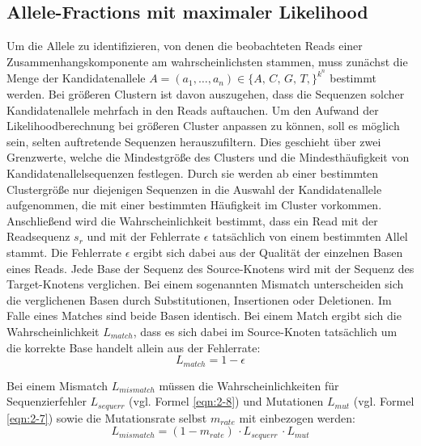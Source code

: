 \subsection{Allele-Fractions mit maximaler Likelihood} \label{subsec:sol_allele_lh}

Um die Allele zu identifizieren, von denen die beobachteten Reads einer Zusammenhangskomponente am wahrscheinlichsten stammen, muss zunächst die Menge der Kandidatenallele $A=(a_{1}, \dots, a_{n}) \in \{A,\,C,\,G,\,T,\}^{k^n}$ bestimmt werden. Bei größeren Clustern ist davon auszugehen, dass die Sequenzen solcher Kandidatenallele mehrfach in den Reads auftauchen. Um den Aufwand der Likelihoodberechnung bei größeren Cluster anpassen zu können, soll es möglich sein, selten auftretende Sequenzen herauszufiltern. Dies geschieht über zwei Grenzwerte, welche die Mindestgröße des Clusters und die Mindesthäufigkeit von Kandidatenallelsequenzen festlegen. Durch sie werden ab einer bestimmten Clustergröße nur diejenigen Sequenzen in die Auswahl der Kandidatenallele aufgenommen, die mit einer bestimmten Häufigkeit im Cluster vorkommen.\\

Anschließend wird die Wahrscheinlichkeit bestimmt, dass ein Read mit der Readsequenz $s_{r}$ und mit der Fehlerrate $\epsilon$ tatsächlich von einem bestimmten Allel stammt. Die Fehlerrate $\epsilon$ ergibt sich dabei aus der Qualität der einzelnen Basen eines Reads. Jede Base der Sequenz des Source-Knotens wird mit der Sequenz des Target-Knotens verglichen. Bei einem sogenannten Mismatch unterscheiden sich die verglichenen Basen durch Substitutionen, Insertionen oder Deletionen. Im Falle eines Matches sind beide Basen identisch. Bei einem Match ergibt sich die Wahrscheinlichkeit $L_{match}$, dass es sich dabei im Source-Knoten tatsächlich um die korrekte Base handelt allein aus der Fehlerrate:
\begin{equation} \label{eqn:2-13}
\tag{2-13}
L_{match} = 1 - \epsilon
\end{equation}

Bei einem Mismatch $L_{mismatch}$ müssen die Wahrscheinlichkeiten für Sequenzierfehler $L_{sequerr}$ (vgl. Formel \eqref{eqn:2-8}) und Mutationen $L_{mut}$ (vgl. Formel \eqref{eqn:2-7}) sowie die Mutationsrate selbst $m_{rate}$ mit einbezogen werden: 
\begin{equation} \label{eqn:2-14}
\tag{2-14}
L_{mismatch} = (1 - m_{rate}) \, \cdotp L_{sequerr} \, \cdotp L_{mut}
\end{equation}

